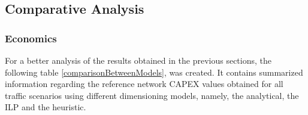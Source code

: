 \subsection{Comparative Analysis}

\subsubsection{Economics}
For a better analysis of the results obtained in the previous sections, the following table \ref{comparisonBetweenModels}, was created. It contains summarized information regarding the reference network CAPEX values obtained for all traffic scenarios using different dimensioning models, namely, the analytical, the ILP and the heuristic.

\vspace{11pt}

